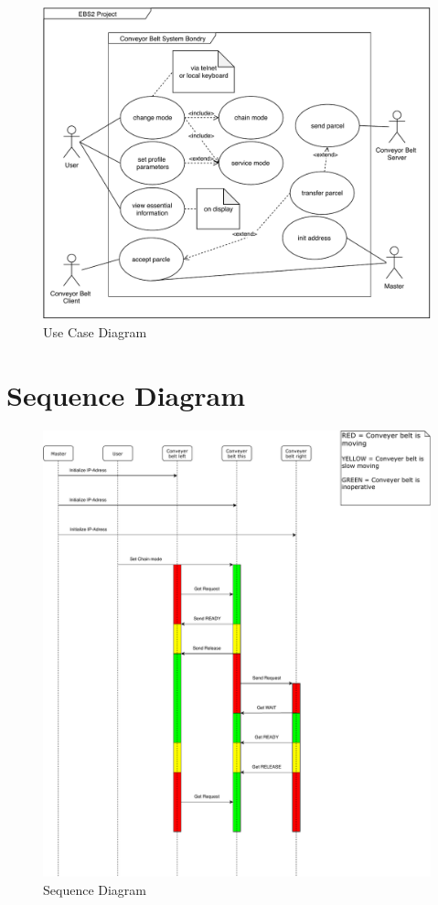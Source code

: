 \documentclass[a4paper,12pt,twoside]{scrreprt}
\begin{document}
\begin{figure}[H]
	\centering
	\includegraphics[width=\textwidth,height=\textheight,keepaspectratio]{useCaseDiagram/UseCaseDiagram.pdf}
	\caption[Use Case Diagram]{Use Case Diagram}
	\label{fig:UseCaseDiagram}
\end{figure}

\section{Sequence Diagram}
\label{chap:Sequence_Diagram}

\begin{figure}[H]
	\centering
	\includegraphics[width=\textwidth,height=\textheight,keepaspectratio]{sequenceDiagram/SequenceDiagram.pdf}
	\caption[Sequence Diagram]{Sequence Diagram}
	\label{fig:SequenceDiagram}
\end{figure}
\end{document}
